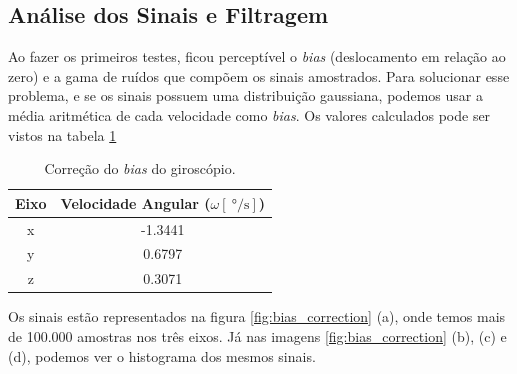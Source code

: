 
\subsection{Análise dos Sinais e Filtragem}

Ao fazer os primeiros testes, ficou perceptível o \textit{bias} (deslocamento em relação ao zero) e a gama de ruídos que compõem os sinais amostrados. Para solucionar esse problema, e se os sinais possuem uma distribuição gaussiana, podemos usar a média aritmética de cada velocidade como \textit{bias}. Os valores calculados pode ser vistos na tabela \ref{tab:bias_correction} 

\begin{table}[H]
  \caption{Correção do \textit{bias} do giroscópio.}
  \label{tab:bias_correction}
  \centering%
  \begin{minipage}{.42\textwidth}
    \begin{tabular*}{\textwidth}{cc}
      \hline
      {Eixo} & Velocidade Angular ($\omega [\SI{}{\degree\per\second}]$)\\ \hline
      \hline
      x  &  -1.3441 \\ 
      y  &  0.6797 \\
      z  &  0.3071 \\ \hline
    \end{tabular*}
  \end{minipage}
\end{table}

Os sinais estão representados na figura \ref{fig:bias_correction} (a), onde temos mais de 100.000 amostras nos três eixos. Já nas imagens \ref{fig:bias_correction} (b), (c) e (d), podemos ver o histograma dos mesmos sinais.

